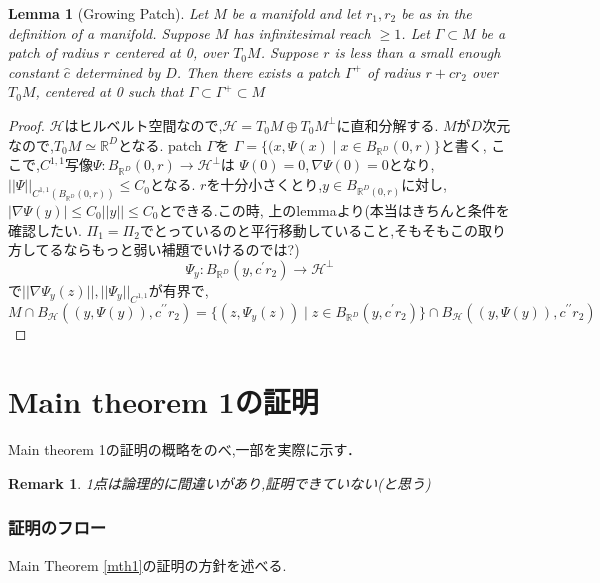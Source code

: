 \documentclass{jarticle}
\newtheorem{lem}[thm]{Lemma}
\newtheorem*{rem}{Remark}
\begin{document}
\begin{lem}[Growing Patch]
  Let $M$ be a manifold and let $r_1,r_2$ be as in the definition of a manifold.
Suppose $M$ has infinitesimal reach $ \ge 1$. Let $\Gamma \subset M$ be a patch of radius $r$ centered at 0, over $T_0M$. Suppose
$r$ is less than a small enough constant $\hat{c}$ determined by $D$. Then there exists a patch $\Gamma^{+}$ of radius $r + cr_2$
over $T_0M$, centered at 0 such that $\Gamma \subset \Gamma^{+} \subset M$
\end{lem}
\begin{proof}
 $\mathcal{H}$はヒルベルト空間なので,$\mathcal{H}=T_0M \oplus T_0M^{\perp}$に直和分解する.
 $M$が$D$次元なので,$T_0M \simeq \mathbb{R}^D$となる.
 patch $\Gamma$を
 $\Gamma =\{(x,\Psi(x) \mid x \in B_{\mathbb{R}^D}(0,r) \}$と書く,
ここで,$C^{1,1}$写像$\Psi: B_{\mathbb{R}^D}(0,r) \to \mathcal{H}^{\perp}$は
$\Psi(0)=0,\nabla\Psi(0)=0$となり,$||\Psi||_{C^{1,1}(B_{\mathbb{R}^D}(0,r))} \le C_0$となる.
$r$を十分小さくとり,$y \in B_{\mathbb{R}^D(0,r)}$に対し,
$|\nabla \Psi(y)| \le C_0||y|| \le C_0$とできる.この時,
上のlemmaより(本当はきちんと条件を確認したい.
$\Pi_1=\Pi_2$でとっているのと平行移動していること,そもそもこの取り方してるならもっと弱い補題でいけるのでは?)
\begin{equation*}
 \Psi_y:B_{\mathbb{R}^D}(y,c^{\prime} r_2) \to \mathcal{H}^{\perp}
\end{equation*}
で$||\nabla\Psi_y(z)||,||\Psi_y||_{C^{1,1}}$が有界で,
\begin{equation*}
 M \cap B_{\mathcal{H}}((y,\Psi(y)),c^{\prime\prime} r_2) =
 \{ (z,\Psi_y(z)) \mid z \in B_{\mathbb{R}^D}(y,c^{\prime} r_2)\}
 \cap B_{\mathcal{H}}((y,\Psi(y)),c^{\prime\prime} r_2)
\end{equation*}
\end{proof}

\part{Main theorem 1の証明}
Main theorem 1の証明の概略をのべ,一部を実際に示す．
\begin{rem}
1点は論理的に間違いがあり,証明できていない(と思う)
\end{rem}

\section{証明のフロー}
\label{sec:証明のフロー}

Main Theorem \ref{mth1}の証明の方針を述べる.
\end{document}
